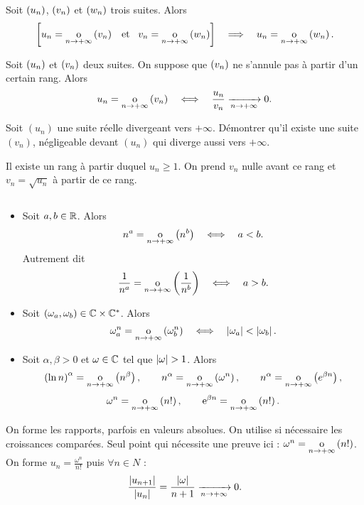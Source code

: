 \documentclass{magnolia}
\begin{document}
\begin{proposition}[utile=-3]
Soit $\left(u_n\right)$, $\left(v_n\right)$ et $\left(w_n\right)$ trois suites. Alors
\[\left[u_n=\underset{n \rightarrow +\infty}{\text{o}}\left(v_n\right) \quad\!\text{et}\quad\! v_n=\underset{n \rightarrow +\infty}{\text{o}}\left(w_n\right)\right]
  \quad\Longrightarrow\quad u_n=\underset{n \rightarrow +\infty}{\text{o}}\left(w_n\right).\]
\end{proposition}

\begin{proposition}[utile=-3]
Soit $\left(u_n\right)$ et $\left(v_n\right)$ deux suites. On suppose que $\left(v_n\right)$ ne s'annule pas
à partir d'un certain rang. Alors
\[u_n=\underset{n \rightarrow +\infty}{\text{o}}\left(v_n\right) \quad\Longleftrightarrow\quad
  \frac{u_n}{v_n}\xrightarrow[n\rightarrow +\infty]{} 0.\]
\end{proposition}


\begin{exoUnique}
\exo Soit $(u_n)$ une suite réelle divergeant vers $+\infty$. Démontrer
  qu'il existe une suite $(v_n)$, négligeable devant $(u_n)$ qui diverge aussi
  vers $+\infty$.
\end{exoUnique}

\begin{sol}
Il existe un rang à partir duquel $u_n\geq 1$. On prend $v_n$ nulle avant ce rang et $v_n=\sqrt{u_n}$ à partir de ce rang.
\end{sol}

\begin{proposition}[utile=-3]
$\quad$
\begin{itemize}
\item Soit $a,b\in\mathbb{R}$. Alors
  \[n^a = \underset{n \rightarrow +\infty}{\text{o}}\left(n^b\right) \quad\Longleftrightarrow\quad a<b.\]
  Autrement dit
  \[\frac{1}{n^a} = \underset{n \rightarrow +\infty}{\text{o}}\left(\frac{1}{n^b}\right) \quad\Longleftrightarrow\quad a>b.\]
\item Soit $(\omega_a,\omega_b)\in\mathbb{C}\times\mathbb{C}^*$. Alors
  \[\omega_a^n = \underset{n \rightarrow +\infty}{\text{o}}\left(\omega_b^n\right) \quad\Longleftrightarrow\quad
    \left|\omega_a\right| < \left|\omega_b\right|.\]
\item Soit $\alpha,\beta>0$ et $\omega\in\mathbb{C}$ tel que $\abs{\omega}>1$. Alors
  \[\left(\ln n\right)^\alpha = \underset{n \rightarrow +\infty}{\text{o}}\left(n^\beta\right), \qquad
    n^\alpha = \underset{n \rightarrow +\infty}{\text{o}}\left(\omega^n\right), \qquad
    n^\alpha=\underset{n \rightarrow +\infty}{\text{o}}\left(e^{\beta n}\right),\]
  \[\omega^n = \underset{n \rightarrow +\infty}{\text{o}}\left(n!\right), \qquad
    {\rm e}^{\beta n} = \underset{n \rightarrow +\infty}{\text{o}}\left(n!\right).\]
\end{itemize}
\end{proposition}
\begin{preuve}
On forme les rapports, parfois en valeurs absolues. On utilise si nécessaire les croissances comparées.
Seul point qui nécessite une preuve ici :
$\omega^n = \underset{n \rightarrow +\infty}{\text{o}}\left(n!\right)$. On forme $\displaystyle u_n=\frac{\omega^n}{n!}$ puis $\forall n\in N$ :
$$\frac{\left|u_{n+1}\right|}{\left|u_n\right|}=\frac{\left|\omega\right|}{n+1}\xrightarrow[n\rightarrow +\infty]{}{0}.$$
\end{preuve}
\end{document}
